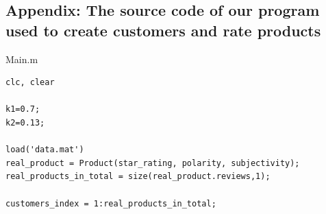 \documentclass[12pt]{article}  %
\begin{document}
\begin{subappendices}  %

  \section{Appendix: The source code of our program used to create customers and rate products}
  \noindent
Main.m

\begin{lstlisting}
clc, clear

k1=0.7;
k2=0.13;

load('data.mat')
real_product = Product(star_rating, polarity, subjectivity);
real_products_in_total = size(real_product.reviews,1);

customers_index = 1:real_products_in_total;


\end{lstlisting}
\end{subappendices}
\end{document}
